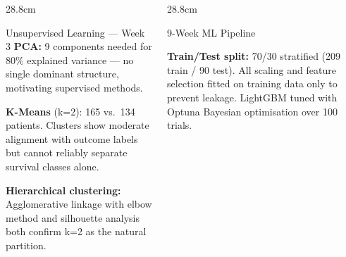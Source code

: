 \documentclass[final]{beamer}
\begin{document}
\begin{frame}[t]{}
\begin{columns}[t, totalwidth=119.2cm]
\begin{column}{28.8cm}
\begin{block}{Unsupervised Learning — Week 3}
  \textbf{PCA:} 9 components needed for 80\% explained variance
  — no single dominant structure, motivating supervised methods.

  \medskip
  \textbf{K-Means} (k=2): 165 vs.\ 134 patients.
  Clusters show moderate alignment with outcome labels but
  cannot reliably separate survival classes alone.

  \medskip
  \textbf{Hierarchical clustering:} Agglomerative linkage with
  elbow method and silhouette analysis both confirm k=2 as the
  natural partition.
\end{block}

\end{column}

\begin{column}{28.8cm}

\begin{block}{9-Week ML Pipeline}
  \begin{center}
  \end{center}

  \medskip
  \textbf{Train/Test split:} 70/30 stratified (209 train / 90 test).
  All scaling and feature selection fitted on training data only to
  prevent leakage. LightGBM tuned with Optuna Bayesian
  optimisation over 100 trials.
\end{block}


\end{column}
\end{columns}
\end{frame}
\end{document}
